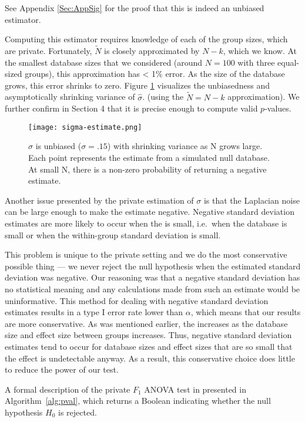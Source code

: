 See Appendix \ref{Sec:AppSig} for the proof that this is indeed an unbiased estimator.  

Computing this estimator requires knowledge of each of the group sizes, which are private. Fortunately, $\tilde{N}$ is closely approximated by $N-k$, which we know. At the smallest database sizes that we considered (around $N = 100$ with three equal-sized groups), this approximation has < 1\% error. As the size of the database grows, this error shrinks to zero.  Figure \ref{fig:sigma-estimate} visualizes the unbiasedness and asymptotically shrinking variance of $\hat{\sigma}$. (using the $\tilde{N} = N-k$ approximation).  We further confirm in Section 4 that it is precise enough to compute valid $p$-values. 


\begin{figure}
\centering
\texttt{[image: sigma-estimate.png]}
\caption{$\hat{\sigma}$ is unbiased ($\sigma = .15$) with shrinking variance as N grows large. Each point represents the estimate from a simulated null database. At small N, there is a non-zero probability of returning a negative estimate.\label{fig:sigma-estimate}}
\end{figure}

Another issue presented by the private estimation of $\sigma$ is that the Laplacian noise can be large enough to make the estimate negative. Negative standard deviation estimates are more likely to occur when the \se is small, i.e.~when the database is small or when the within-group standard deviation is small.

This problem is unique to the private setting and we do the most conservative possible thing --- we never reject the null hypothesis when the estimated standard deviation was negative. Our reasoning was that a negative standard deviation has no statistical meaning and any calculations made from such an estimate would be uninformative.  This method for dealing with negative standard deviation estimates results in a type I error rate lower than $\alpha$, which means that our results are more conservative. As was mentioned earlier, the \sa increases as the database size and effect size between groups increases. Thus, negative standard deviation estimates tend to occur for database sizes and effect sizes that are so small that the effect is undetectable anyway.  As a result, this conservative choice does little to reduce the power of our test.

A formal description of the private $F_1$ ANOVA test in presented in Algorithm~\ref{alg:pval}, which returns a Boolean indicating whether the null hypothesis $H_0$ is rejected. 

